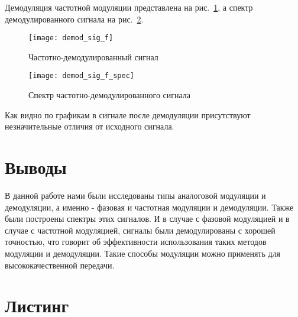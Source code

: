Демодуляция частотной модуляции представлена на рис.~\ref{pic:freq_demod_sig}, а спектр демодулированного сигнала на рис.~\ref{pic:freq_demod_sig_spec}.
\begin{figure}[H]
	\begin{center}
		\texttt{[image: demod\_sig\_f]}
		\caption{Частотно-демодулированный сигнал} 
		\label{pic:freq_demod_sig} %
	\end{center}
\end{figure}
\begin{figure}[H]
	\begin{center}
		\texttt{[image: demod\_sig\_f\_spec]}
		\caption{Спектр частотно-демодулированного сигнала} 
		\label{pic:freq_demod_sig_spec} %
	\end{center}
\end{figure}
Как видно по графикам в сигнале после демодуляции присутствуют незначительные отличия от исходного сигнала.

\section{Выводы}

В данной работе нами были исследованы типы аналоговой модуляции и демодуляции, а именно - фазовая и частотная модуляции и демодуляции. Также были построены спектры этих сигналов. И в случае с фазовой модуляцией и в случае с частотной модуляцией,
сигналы были демодулированы с хорошей точностью, что говорит об эффективности использования таких методов модуляции и демодуляции. 
Такие способы модуляции можно применять для высококачественной передачи.

\section{Листинг}




